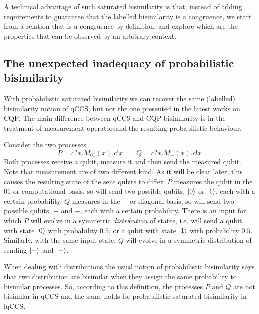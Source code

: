 A technical advantage of such saturated bisimilarity is that, instead of adding requirements to guarantee that the labelled bisimilarity is a congruence, we start from a relation that is a congruence by definition, and explore which are the properties that can be observed by an arbitrary context.


\subsection*{The unexpected inadequacy of probabilistic bisimilarity}

With probabilistic saturated bisimilarity we can recover the same (labelled) bisimilarity notion of qCCS, but not the one presented in the latest works on CQP. The main difference between qCCS and CQP bisimilarity is in the treatment of measurement operatorsand the resulting probabilistic behaviour.

Consider the two processes 
\[P = c?x.M_{01}(x).c!x \qquad Q = c?x.M_\pm(x).c!x\]
Both processes receive a qubit, measure it and then send the measured qubit. Note that measurement are of two different kind. As it will be clear later, this causes the resulting state of the sent qubits to differ. $P$ measures the qubit in the $01$ or computational basis, so will send two possible qubits, $\ket{0}$ or $\ket{1}$, each with a certain probability. $Q$ measures in the $\pm$ or diagonal basis, so will send two possible qubits, $+$ and $-$, each with a certain probability. There is an input for which $P$ will evolve in a symmetric \textit{distribution} of states, i.e. will send a qubit with state $\ket{0}$ with probability $0.5$, or a qubit with state $\ket{1}$ with probability $0.5$. Similarly, with the same input state, $Q$ will evolve in a symmetric distribution of sending $\ket{+}$ and $\ket{-}$.

When dealing with distributions the usual notion of  probabilistic bisimilarity says that two distribution are bisimilar when they assign the same probability to bisimilar processes. So, according to this definition, the processes $P$ and $Q$ are not bisimilar in qCCS and the same holds for probabilistic saturated bisimilarity in lqCCS.

